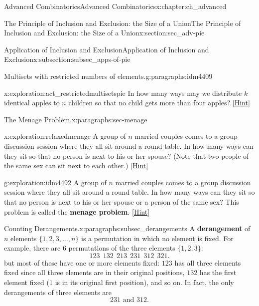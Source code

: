 \documentclass[oneside,10pt,]{book}
\newcommand{\terminology}[1]{\textbf{#1}}
\numberwithin{equation}{chapter}
\begin{document}
\begin{chapterptx}{Advanced Combinatorics}{}{Advanced Combinatorics}{}{}{x:chapter:ch_advanced}
\begin{sectionptx}{The Principle of Inclusion and Exclusion: the Size of a Union}{}{The Principle of Inclusion and Exclusion: the Size of a Union}{}{}{x:section:sec_adv-pie}
\begin{subsectionptx}{Application of Inclusion and Exclusion}{}{Application of Inclusion and Exclusion}{}{}{x:subsection:subsec_apps-of-pie}
\begin{paragraphs}{Multisets with restricted numbers of elements.}{g:paragraphs:idm4409}
\begin{exploration}{}{x:exploration:act_restrictedmultisetspie}%
In how many ways may we distribute \(k\) identical apples to \(n\) children so that no child gets more than four apples?%
\space\hspace*{0pt}\hfill{\tiny\hyperlink{g:hint:idm4416-back}{[Hint]}}\end{exploration}
\end{paragraphs}%
\begin{paragraphs}{The Menage Problem.}{x:paragraphs:sec-menage}%
\begin{exploration}{}{x:exploration:relaxedmenage}%
A group of \(n\) married couples comes to a group discussion session where they all sit around a round table. In how many ways can they sit so that no person is next to his or her spouse? (Note that two people of the same sex can sit next to each other.)%
\space\hspace*{0pt}\hfill{\tiny\hyperlink{g:hint:idm4460-back}{[Hint]}}\end{exploration}
\begin{exploration}{}{g:exploration:idm4492}%
A group of \(n\) married couples comes to a group discussion session where they all sit around a round table. In how many ways can they sit so that no person is next to his or her spouse or a person of the same sex? This problem is called the \terminology{menage problem}.%
\space\hspace*{0pt}\hfill{\tiny\hyperlink{g:hint:idm4499-back}{[Hint]}}\end{exploration}
\end{paragraphs}%
\begin{paragraphs}{Counting Derangements.}{x:paragraphs:subsec_derangements}%
A \terminology{derangement} of \(n\) elements \(\{1,2,3,\ldots, n\}\) is a permutation in which no element is fixed. For example, there are \(6\) permutations of the three elements \(\{1,2,3\}\):%
\begin{equation*}
123 ~~ 132 ~~ 213 ~~ 231 ~~ 312 ~~ 321.
\end{equation*}
but most of these have one or more elements fixed: \(123\) has all three elements fixed since all three elements are in their original positions, \(132\) has the first element fixed (1 is in its original first position), and so on. In fact, the only derangements of three elements are%
\begin{equation*}
231 \text{ and } 312.
\end{equation*}
%
\par

\end{paragraphs}
\end{subsectionptx}
\end{sectionptx}
\end{chapterptx}
\end{document}
